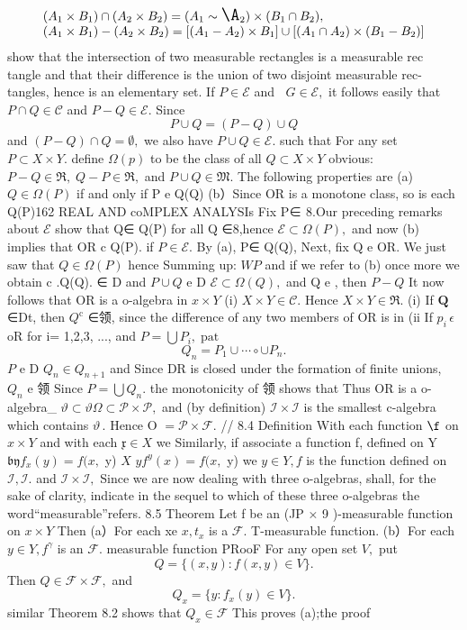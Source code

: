 $$ \begin{array}{l}{{(A_{1}\times B_{1})\cap(A_{2}\times B_{2})=(A_{1}\Large\sim\A_{2})\times(B_{1}\cap B_{2}),}}\\ {{(A_{1}\times B_{1})-(A_{2}\times B_{2})=[(A_{1}-A_{2})\times B_{1}]\cup[(A_{1}\cap\strut A_{2})\times(B_{1}-B_{2})]}}\end{array} $$ show that the intersection of two measurable rectangles is a measurable rec tangle and that their difference is the union of two disjoint measurable rec- tangles, hence is an elementary set. If $P\in{\mathcal{E}}$ and $\;\;G\in{\mathcal{E}},$ it follows easily that $P\cap Q\in{\mathcal{C}}$ and $P-Q\in{\mathcal{E}}.$ Since $$ P\cup Q=(P-Q)\cup Q $$ and $(P-Q)\cap Q=\emptyset,$ we also have $P\cup Q\in{\mathcal{E}}.$ such that For any set $P\subset X\times Y.$ define $\scriptstyle\Omega(p)$ to be the class of all $Q\subset X\times Y$ obvious: $P-Q\in\Re,\;Q-P\in\Re,$ and $P\cup Q\in\mathfrak{M}.$ The following properties are (a) $Q\in\Omega(P)$ if and only if P e Q(Q) (b）Since OR is a monotone class, so is each Q(P)162 REAL AND coMPLEX ANALYSIs Fix P∈ 8.Our preceding remarks about $\textstyle{\mathcal{E}}$ show that Q∈ Q(P) for all Q ∈8,hence ${\mathcal{E}}\subset\Omega(P),$ and now (b) implies that OR c Q(P). if $P\in{\mathcal{E}}.$ By (a), P∈ Q(Q), Next, fix Q e OR. We just saw that $Q\in\Omega(P)$ hence Summing up: $\scriptstyle{W P}$ and if we refer to (b) once more we obtain c .Q(Q). ∈ D and $P\cup Q$ e D ${\mathcal{E}}\subset\Omega(Q),$ and Q e , then $\scriptstyle{P-Q}$ It now follows that OR is a o-algebra in $x\times Y$ (i) $X\times Y\in{\mathcal{C}}.$ Hence $X\times Y\in\Re.$ (i) If ${\boldsymbol{Q}}$ ∈Dt, then $Q^{\mathrm{c}}$ ∈领, since the difference of any two members of OR is in (ii If $\scriptstyle p_{i}\,\epsilon$ oR for i= 1,2,3, ..., and $P=\bigcup P_{i},\operatorname{pat}$ $$ Q_{n}=P_{1}\cup\cdots\circ\cup P_{n}. $$ ${\mathbf{}}P$ e D $Q_{n}\in Q_{n+1}$ and Since DR is closed under the formation of finite unions, $Q_{n}$ e 领 Since $P=\bigcup Q_{n}.$ the monotonicity of 领 shows that Thus OR is a o-algebra_ $\vartheta\subset\vartheta\Omega\subset\mathcal{P}\times\mathcal{P},$ and (by definition) ${\mathcal{I}}\times{\mathcal{I}}$ is the smallest c-algebra which contains ${\mathcal{\vartheta}}\,.$ Hence O $={\mathcal{P}}\times{\mathcal{F}}.$ // 8.4 Definition With each function $\boldsymbol{\f}$ on $x\times Y$ and with each ${\mathfrak{x}}\in X$ we Similarly, if associate a function f, defined on Y ${\mathfrak{b y}}f_{x}(y)=f(x,$ y) $X$ $y f^{y}(x)=f(x,$ y) we $y\in Y,f$ is the function defined on ${\mathcal{I}},{\mathcal{I}}.$ and ${\mathcal{I}}\times{\mathcal{I}},$ Since we are now dealing with three o-algebras, shall, for the sake of clarity, indicate in the sequel to which of these three o-algebras the word“measurable”refers. 8.5 Theorem Let f be an (JP × 9 )-measurable function on $x\times Y$ Then (a）For each xe $x,t_{x}$ is a ${\mathcal{F}}.$ T-measurable function. (b）For each $y\in Y,f^{\gamma}$ is an ${\mathcal{F}}.$ measurable function PRooF For any open set ${\mathit{V}},$ put $$ Q=\{(x,y)\colon f(x,y)\in V\}. $$ Then $Q\in{\mathcal{F}}\times{\mathcal{F}},$ and $$ Q_{x}=\{y\colon f_{x}(y)\in V\}. $$ similar Theorem 8.2 shows that $Q_{x}\in{\mathcal{F}}$ This proves (a);the proof 